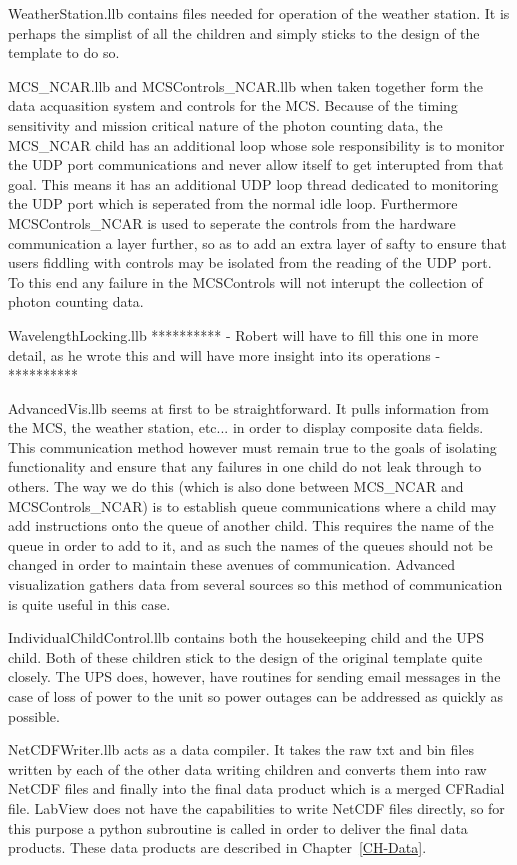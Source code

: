 WeatherStation.llb contains files needed for operation of the weather station. It is perhaps the simplist of all the children and simply sticks to the design of the template to do so.  

MCS\_NCAR.llb and MCSControls\_NCAR.llb when taken together form the data acquasition system and controls for the MCS. Because of the timing sensitivity and mission critical nature of the photon counting data, the MCS\_NCAR child has an additional loop whose sole responsibility is to monitor the UDP port communications and never allow itself to get interupted from that goal. This means it has an additional UDP loop thread dedicated to monitoring the UDP port which is seperated from the normal idle loop. Furthermore MCSControls\_NCAR is used to seperate the controls from the hardware communication a layer further, so as to add an extra layer of safty to ensure that users fiddling with controls may be isolated from the reading of the UDP port. To this end any failure in the MCSControls will not interupt the collection of photon counting data. 

WavelengthLocking.llb ********** - Robert will have to fill this one in more detail, as he wrote this and will have more insight into its operations - **********

AdvancedVis.llb seems at first to be straightforward. It pulls information from the MCS, the weather station, etc... in order to display composite data fields. This communication method however must remain true to the goals of isolating functionality and ensure that any failures in one child do not leak through to others. The way we do this (which is also done between MCS\_NCAR and MCSControls\_NCAR) is to establish queue communications where a child may add instructions onto the queue of another child. This requires the name of the queue in order to add to it, and as such the names of the queues should not be changed in order to maintain these avenues of communication. Advanced visualization gathers data from several sources so this method of communication is quite useful in this case. 

IndividualChildControl.llb contains both the housekeeping child and the UPS child. Both of these children stick to the design of the original template quite closely. The UPS does, however, have routines for sending email messages in the case of loss of power to the unit so power outages can be addressed as quickly as possible. 

NetCDFWriter.llb acts as a data compiler. It takes the raw txt and bin files written by each of the other data writing children and converts them into raw NetCDF files and finally into the final data product which is a merged CFRadial file. LabView does not have the capabilities to write NetCDF files directly, so for this purpose a python subroutine is called in order to deliver the final data products. These data products are described in Chapter~\ref{CH-Data}.





